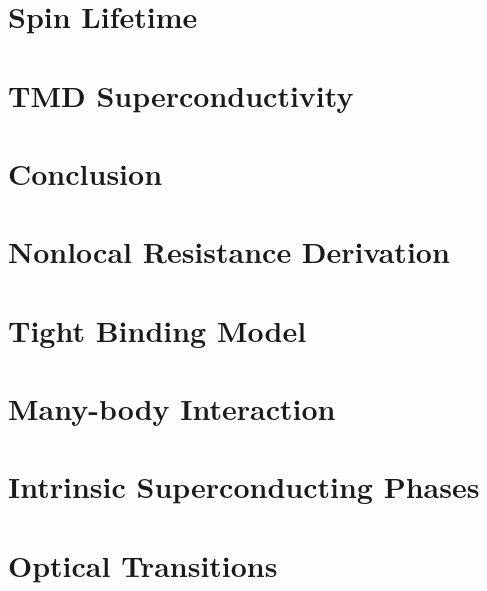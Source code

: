 \documentclass[oneside,12pt]{memoir}
\begin{document}
  \frontmatter{}
  
  
  
  \pagestyle{thesis}
  
  
  
  \newpage
  \tableofcontents
  \newpage
  \listoffigures
  \mainmatter{}
  

  \chapter{Spin Lifetime}\label{s:spin-lifetime}
  
  
  
  

  \chapter{TMD Superconductivity}\label{s:dichalcogenides}
  
  
  
  
  

  \chapter{Conclusion}
  

  \begin{appendices}

    \chapter{Nonlocal Resistance Derivation}
    

    \chapter{Tight Binding Model}
    

    \chapter{Many-body Interaction}
    

    \chapter{Intrinsic Superconducting Phases}
    

    \chapter{Optical Transitions}
    
  \end{appendices}
  \backmatter{}
  \SingleSpacing{}
  \printbibliography{}
\end{document}
